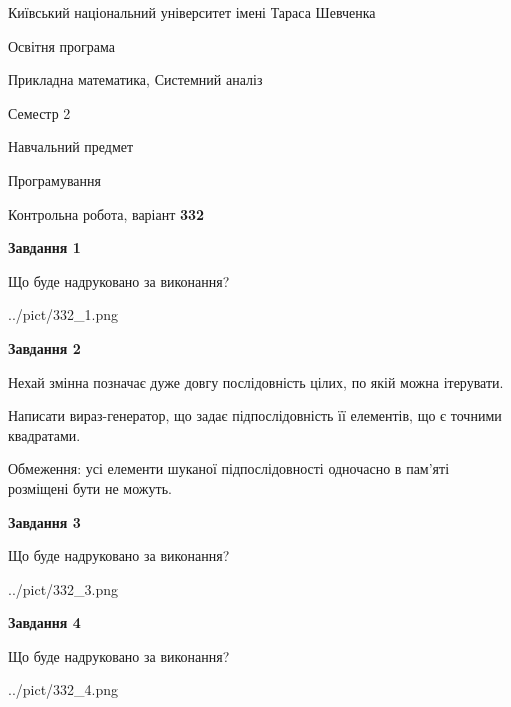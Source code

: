 \documentclass[12pt, ukrainian]{article}
\begin{document}
{{\begin {small}\par
{ \center  Київський національний університет імені Тараса Шевченка \par}
{\parbox {5 cm}{Освітня програма \hfill}{\parbox {8 cm}{Прикладна математика, Системний аналіз \hfill}}\parbox {5 cm}{\hfill Семестр 2}}\par
{\parbox {5 cm} {Навчальний предмет \hfill}\parbox {7 cm}{Програмування \hfill}\parbox {6cm}{\hfill}\par}\vspace{-7pt} \end{small}}{\center Контрольна робота, варіант  \No \textbf
{ 332 }\par}}
{
\begin {large}
{\begin {center}\textbf{Завдання 1}\end {center}}\par
Що буде надруковано за виконання?\par\par
\begin{center}
	{../pict/332_1.png}
\end{center}
\newpage

{\begin {center}\textbf{Завдання 2}\end {center}}\par
Нехай змінна  позначає дуже довгу послідовність цілих, по якій можна ітерувати.

Написати вираз-генератор, що задає підпослідовність її елементів, що є точними квадратами.

Обмеження: усі елементи шуканої підпослідовності одночасно в пам'яті розміщені бути не можуть.\par
\newpage

{\begin {center}\textbf{Завдання 3}\end {center}}\par
Що буде надруковано за виконання?
\begin{center}
	{../pict/332_3.png}
\end{center}
\newpage

{\begin {center}\textbf{Завдання 4}\end {center}}\par
Що буде надруковано за виконання?\par
\begin{center}
	{../pict/332_4.png}
\end{center}
\newpage


\end{large}}
\end{document}
